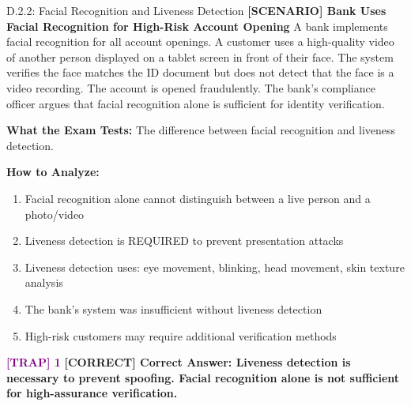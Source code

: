 \documentclass[11pt,a4paper]{beamer}
\newcommand{\trap}[1]{\textcolor{purple}{\textbf{[TRAP] 1}}}
\newcommand{\correct}[1]{\textcolor{green!50!black}{\textbf{[CORRECT] #1}}}
\newcommand{\scenario}[1]{\textcolor{blue!70!black}{\textbf{[SCENARIO] #1}}}
\begin{document}
\begin{frame}{D.2.2: Facial Recognition and Liveness Detection}
	\scenario{Bank Uses Facial Recognition for High-Risk Account Opening}
	A bank implements facial recognition for all account openings. A customer uses a high-quality video of another person displayed on a tablet screen in front of their face. The system verifies the face matches the ID document but does not detect that the face is a video recording. The account is opened fraudulently. The bank's compliance officer argues that facial recognition alone is sufficient for identity verification.
	
	\vspace{0.1cm}
	\textbf{What the Exam Tests:} The difference between facial recognition and liveness detection.
	
	\vspace{0.1cm}
	\textbf{How to Analyze:}
	\begin{enumerate}
		\item Facial recognition alone cannot distinguish between a live person and a photo/video
		\item Liveness detection is REQUIRED to prevent presentation attacks
		\item Liveness detection uses: eye movement, blinking, head movement, skin texture analysis
		\item The bank's system was insufficient without liveness detection
		\item High-risk customers may require additional verification methods
	\end{enumerate}
	
	\trap{Common Distractor: "Facial recognition is sufficient for identity verification in all cases."}
	\correct{Correct Answer: Liveness detection is necessary to prevent spoofing. Facial recognition alone is not sufficient for high-assurance verification.}
\end{frame}
\end{document}
